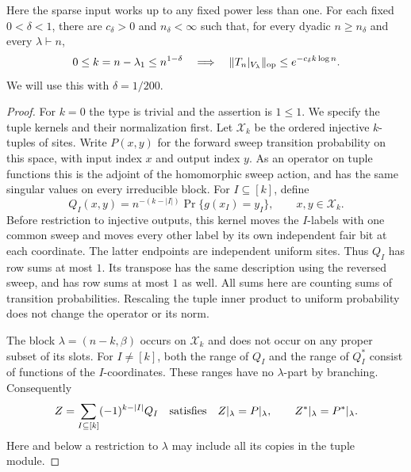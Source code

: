 Here the sparse input works up to any fixed power less than one.
For each fixed $0<\delta<1$, there are $c_\delta>0$ and
$n_\delta<\infty$ such that, for every dyadic $n\ge n_\delta$
and every $\lambda\vdash n$,
\begin{equation}\label{rec:chunk-sparse}
 0\le k=n-\lambda_1\le n^{1-\delta}
 \quad\Longrightarrow\quad
 \|T_n|_{V_\lambda}\|_{\mathrm{op}}\le e^{-c_\delta k\log n}.
\end{equation}
We will use this with $\delta=1/200$.
\begin{proof}
For $k=0$ the type is trivial and the assertion is $1\le1$.
We specify the tuple kernels and their normalization first.
Let $\mathcal X_k$ be the ordered injective $k$-tuples of sites.
Write $P(x,y)$ for the forward sweep transition probability on
this space, with input index $x$ and output index $y$.
As an operator on tuple functions this is the adjoint of the
homomorphic sweep action, and has the same singular values
on every irreducible block.  For $I\subseteq[k]$, define
\begin{equation}\label{rec:sparse-partial-kernel}
 Q_I(x,y)=n^{-(k-|I|)}
              \Pr\{g(x_I)=y_I\},\qquad x,y\in\mathcal X_k.
\end{equation}
Before restriction to injective outputs, this kernel moves the
$I$-labels with one common sweep and moves every other label
by its own independent fair bit at each coordinate.
The latter endpoints are independent uniform sites.
Thus $Q_I$ has row sums at most $1$.
Its transpose has the same description using the reversed
sweep, and has row sums at most $1$ as well.
All sums here are counting sums of transition probabilities.
Rescaling the tuple inner product to uniform probability does
not change the operator or its norm.

The block $\lambda=(n-k,\beta)$ occurs on $\mathcal X_k$ and
does not occur on any proper subset of its slots.
For $I\ne[k]$, both the range of $Q_I$ and the range of $Q_I^*$
consist of functions of the $I$-coordinates.  These ranges
have no $\lambda$-part by branching.  Consequently
\begin{equation}\label{rec:sparse-centered-kernel}
 Z=\sum_{I\subseteq[k]}(-1)^{k-|I|}Q_I
 \quad\hbox{satisfies}\quad
 Z|_\lambda=P|_\lambda,\qquad Z^*|_\lambda=P^*|_\lambda.
\end{equation}
Here and below a restriction to $\lambda$ may include all its
copies in the tuple module.


\end{proof}
